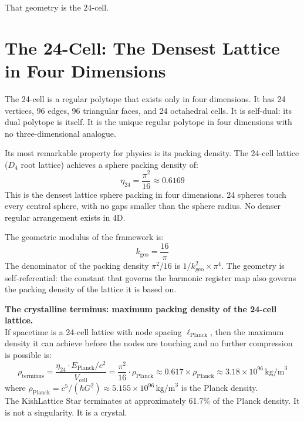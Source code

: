 \documentclass[11pt, letterpaper, openany]{book}
\begin{document}
That geometry is the 24-cell.

\section{The 24-Cell: The Densest Lattice in Four Dimensions}

The 24-cell is a regular polytope that exists only in four dimensions.
It has 24 vertices, 96 edges, 96 triangular faces, and 24 octahedral cells.
It is self-dual: its dual polytope is itself. It is the unique regular
polytope in four dimensions with no three-dimensional analogue.

Its most remarkable property for physics is its packing density.
The 24-cell lattice ($D_4$ root lattice) achieves a sphere packing density of:
\[
\eta_{24} = \frac{\pi^2}{16} \approx 0.6169
\]
This is the densest lattice sphere packing in four dimensions. 24 spheres
touch every central sphere, with no gaps smaller than the sphere radius.
No denser regular arrangement exists in 4D.

The geometric modulus of the framework is:
\[
k_\text{geo} = \frac{16}{\pi}
\]
The denominator of the packing density $\pi^2/16$ is $1/k_\text{geo}^2 \times \pi^4$.
The geometry is self-referential: the constant that governs the harmonic
register map also governs the packing density of the lattice it is based on.

\begin{signalbox}
\textbf{The crystalline terminus: maximum packing density of the 24-cell lattice.}\\[0.5em]
If spacetime is a 24-cell lattice with node spacing $\ell_\text{Planck}$,
then the maximum density it can achieve before the nodes are touching and
no further compression is possible is:
\[
\rho_\text{terminus} = \frac{\eta_{24} \cdot E_\text{Planck}/c^2}{V_\text{cell}}
= \frac{\pi^2}{16} \cdot \rho_\text{Planck}
\approx 0.617 \times \rho_\text{Planck}
\approx 3.18 \times 10^{96}\,\text{kg/m}^3
\]
where $\rho_\text{Planck} = c^5/(\hbar G^2) \approx 5.155 \times 10^{96}\,\text{kg/m}^3$
is the Planck density.\\[0.5em]
The KishLattice Star terminates at approximately 61.7\% of the Planck density.
It is not a singularity. It is a crystal.
\end{signalbox}

\clearpage
\end{document}
